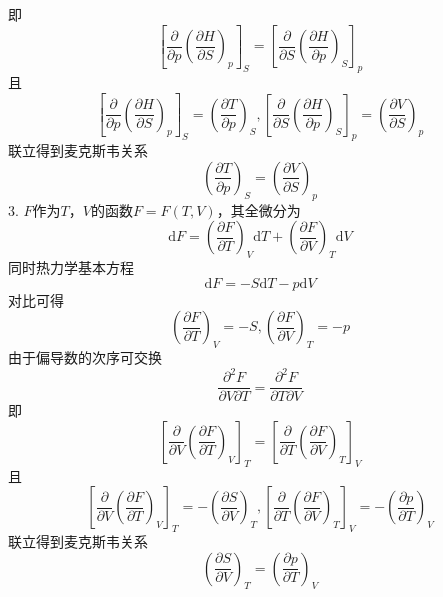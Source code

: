 即
\begin{equation}
    \left[ \frac{\partial}{\partial p}\left( \frac{\partial H}{\partial S} \right) _p \right] _S=\left[ \frac{\partial}{\partial S}\left( \frac{\partial H}{\partial p} \right) _S \right] _p
\end{equation}
且
\begin{equation}
    \left[ \frac{\partial}{\partial p}\left( \frac{\partial H}{\partial S} \right) _p \right] _S=\left( \frac{\partial T}{\partial p} \right) _S,\left[ \frac{\partial}{\partial S}\left( \frac{\partial H}{\partial p} \right) _S \right] _p=\left( \frac{\partial V}{\partial S} \right) _p
\end{equation}
联立得到麦克斯韦关系
\begin{equation}
    \left( \frac{\partial T}{\partial p} \right) _S=\left( \frac{\partial V}{\partial S} \right) _p
\end{equation}
3.
$F$作为$T$，$V$的函数$F=F(T,V)$，其全微分为
\begin{equation}
    \mathrm{d}F=\left( \frac{\partial F}{\partial T} \right) _V\mathrm{d}T+\left( \frac{\partial F}{\partial V} \right) _T\mathrm{d}V
\end{equation}
同时热力学基本方程
\begin{equation}
    \mathrm{d}F=-S\mathrm{d}T-p\mathrm{d}V
\end{equation}
对比可得
\begin{equation}
    \left( \frac{\partial F}{\partial T} \right) _V=-S,\left( \frac{\partial F}{\partial V} \right) _T=-p
\end{equation}
由于偏导数的次序可交换
\begin{equation}
    \frac{\partial ^2F}{\partial V\partial T}=\frac{\partial ^2F}{\partial T\partial V}
\end{equation}
即
\begin{equation}
    \left[ \frac{\partial}{\partial V}\left( \frac{\partial F}{\partial T} \right) _V \right] _T=\left[ \frac{\partial}{\partial T}\left( \frac{\partial F}{\partial V} \right) _T \right] _V
\end{equation}
且
\begin{equation}
    \left[ \frac{\partial}{\partial V}\left( \frac{\partial F}{\partial T} \right) _V \right] _T=-\left( \frac{\partial S}{\partial V} \right) _T,\left[ \frac{\partial}{\partial T}\left( \frac{\partial F}{\partial V} \right) _T \right] _V=-\left( \frac{\partial p}{\partial T} \right) _V
\end{equation}
联立得到麦克斯韦关系
\begin{equation}
    \left( \frac{\partial S}{\partial V} \right) _T=\left( \frac{\partial p}{\partial T} \right) _V
\end{equation}


